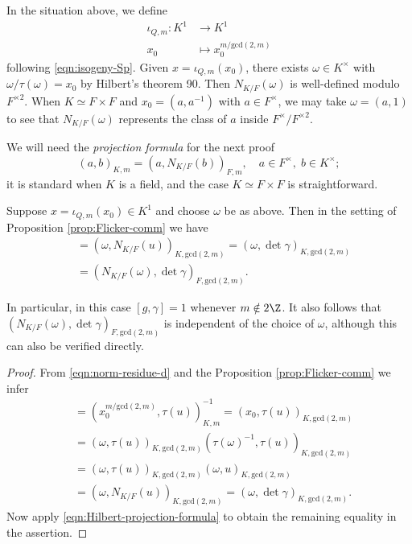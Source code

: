 \documentclass[a4paper,10pt]{article}
\begin{document}
In the situation above, we define
\begin{align*}
	\iota_{Q,m}: K^1 & \longrightarrow K^1 \\
	x_0 & \longmapsto x_0^{m/\mathrm{gcd}(2,m)}
\end{align*}
following \eqref{eqn:isogeny-Sp}. Given $x = \iota_{Q,m}(x_0)$, there exists $\omega \in K^\times$ with $\omega/\tau(\omega) = x_0$ by Hilbert's theorem 90. Then $N_{K/F}(\omega)$ is well-defined modulo $F^{\times 2}$. When $K \simeq F \times F$ and $x_0 = (a, a^{-1})$ with $a \in F^\times$, we may take $\omega = (a,1)$ to see that $N_{K/F}(\omega)$ represents the class of $a$ inside $F^\times/F^{\times 2}$.

We will need the \emph{projection formula} for the next proof
\begin{equation}\label{eqn:Hilbert-projection-formula}
	(a, b)_{K,m} = (a, N_{K/F}(b))_{F,m}, \quad a \in F^\times, \; b \in K^\times;
\end{equation}
it is standard when $K$ is a field, and the case $K \simeq F \times F$ is straightforward.

\begin{lemma}\label{prop:commutator-GL2-T}
	Suppose $x = \iota_{Q,m}(x_0) \in K^1$ and choose $\omega$ be as above. Then in the setting of Proposition \ref{prop:Flicker-comm} we have
	\begin{align*}
		[g,\gamma] & = \left( \omega, N_{K/F}(u) \right)_{K, \mathrm{gcd}(2,m)} = \left( \omega, \det\gamma \right)_{K, \mathrm{gcd}(2,m)} \\
		& = \left( N_{K/F}(\omega), \det\gamma \right)_{F, \mathrm{gcd}(2,m)}.
	\end{align*}
\end{lemma}
In particular, in this case $[g,\gamma]=1$ whenever $m \notin 2\Z$. It also follows that $\left( N_{K/F}(\omega), \det\gamma \right)_{F, \mathrm{gcd}(2,m)}$ is independent of the choice of $\omega$, although this can also be verified directly.
\begin{proof}
	From \eqref{eqn:norm-residue-d} and the Proposition \ref{prop:Flicker-comm} we infer
	\begin{align*}
		[g, \gamma] & = \left( x_0^{m/\text{gcd}(2,m)}, \tau(u) \right)_{K,m}^{-1} = \left( x_0, \tau(u) \right)_{K, \text{gcd}(2,m)} \\
		& = \left( \omega, \tau(u)\right)_{K, \text{gcd}(2,m)} \left( \tau(\omega)^{-1}, \tau(u) \right)_{K, \text{gcd}(2,m)} \\
		& = \left( \omega, \tau(u)\right)_{K, \text{gcd}(2,m)} \left( \omega, u \right)_{K, \text{gcd}(2,m)} \\
		& = \left( \omega, N_{K/F}(u) \right)_{K, \text{gcd}(2,m)} = \left( \omega, \det\gamma \right)_{K, \text{gcd}(2,m)}.
	\end{align*}
	Now apply \eqref{eqn:Hilbert-projection-formula} to obtain the remaining equality in the assertion.
\end{proof}
\end{document}
